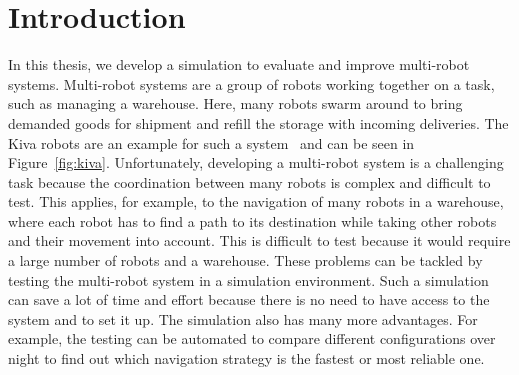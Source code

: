 \chapter{Introduction}
In this thesis, we develop a simulation to evaluate and improve multi-robot systems. Multi-robot systems are a group of robots working together on a task, such as managing a warehouse. Here, many robots swarm around to bring demanded goods for shipment and refill the storage with incoming deliveries. The Kiva robots are an example for such a system~\cite{Kiva} and can be seen in Figure~\ref{fig:kiva}. Unfortunately, developing a multi-robot system is a challenging task because the coordination between many robots is complex and difficult to test. This applies, for example, to the navigation of many robots in a warehouse, where each robot has to find a path to its destination while taking other robots and their movement into account. This is difficult to test because it would require a large number of robots and a warehouse. These problems can be tackled by testing the multi-robot system in a simulation environment. Such a simulation can save a lot of time and effort because there is no need to have access to the system and to set it up. The simulation also has many more advantages. For example, the testing can be automated to compare different configurations over night to find out which navigation strategy is the fastest or most reliable one.\\
